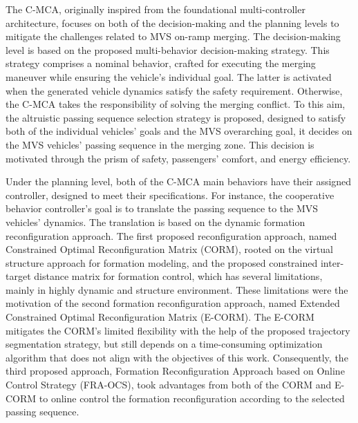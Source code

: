 The C-MCA, originally inspired from the foundational multi-controller architecture, focuses on both of the decision-making and the planning levels to mitigate the challenges related to MVS on-ramp merging. The decision-making level is based on the proposed multi-behavior decision-making strategy. This strategy comprises a nominal behavior, crafted for executing the merging maneuver while ensuring the vehicle's individual goal. The latter is activated when the generated vehicle dynamics satisfy the safety requirement. Otherwise, the C-MCA takes the responsibility of solving the merging conflict. To this aim, the altruistic passing sequence selection strategy is proposed, designed to satisfy both of the individual vehicles' goals and the MVS overarching goal, it decides on the MVS vehicles' passing sequence in the merging zone. This decision is motivated through the prism of safety, passengers' comfort, and energy efficiency. 


Under the planning level, both of the C-MCA main behaviors have their assigned controller, designed to meet their specifications. For instance, the cooperative behavior controller's goal is to translate the passing sequence to the MVS vehicles' dynamics. The translation is based on the dynamic formation reconfiguration approach. The first proposed reconfiguration approach, named Constrained Optimal Reconfiguration Matrix (CORM), rooted on the virtual structure approach for formation modeling, and the proposed constrained inter-target distance matrix for formation control, which has several limitations, mainly in highly dynamic and structure environment. These limitations were the motivation of the second formation reconfiguration approach, named Extended Constrained Optimal Reconfiguration Matrix (E-CORM). The E-CORM mitigates the CORM's limited flexibility with the help of the proposed trajectory segmentation strategy, but still depends on a time-consuming optimization algorithm that does not align with the objectives of this work. Consequently, the third proposed approach, Formation Reconfiguration Approach based on Online Control Strategy (FRA-OCS), took advantages from both of the CORM and E-CORM to online control the formation reconfiguration according to the selected passing sequence. 





















